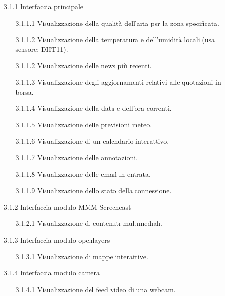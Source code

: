 \documentclass[a4paper,11pt]{article}       %
\begin{document}
        \begin{itemize}
            \item[3.1.1] Interfaccia principale
                \begin{itemize}
                    \item[3.1.1.1] Visualizzazione della qualità dell'aria per la zona specificata.
                    \item[3.1.1.2] Visualizzazione della temperatura e dell'umidità locali (usa sensore: DHT11).
                    \item[3.1.1.2] Visualizzazione delle news più recenti.
                    \item[3.1.1.3] Visualizzazione degli aggiornamenti relativi alle quotazioni in borsa.
                    \item[3.1.1.4] Visualizzazione della data e dell'ora correnti.
                    \item[3.1.1.5] Visualizzazione delle previsioni meteo.
                    \item[3.1.1.6] Visualizzazione di un calendario interattivo.
                    \item[3.1.1.7] Visualizzazione delle annotazioni.
                    \item[3.1.1.8] Visualizzazione delle email in entrata.
                    \item[3.1.1.9] Visualizzazione dello stato della connessione.
                \end{itemize}   
                
            \item[3.1.2] Interfaccia modulo MMM-Screencast
                \begin{itemize}
                    \item[3.1.2.1] Visualizzazione di contenuti multimediali.
                \end{itemize}
            \item[3.1.3] Interfaccia modulo openlayers
                \begin{itemize}
                    \item[3.1.3.1] Visualizzazione di mappe interattive.
                \end{itemize}
            \item[3.1.4] Interfaccia modulo camera
                \begin{itemize}
                    \item[3.1.4.1] Visualizzazione del feed video di una webcam.
                \end{itemize}
        \end{itemize}
    
\end{document}
